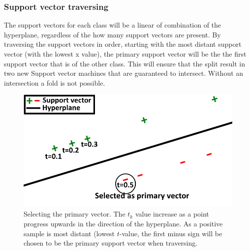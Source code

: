 \documentclass[a4paper,twoside]{bth}
\begin{document}
\subsubsection{Support vector traversing}
\par The support vectors for each class will be a linear of combination of the hyperplane, regardless of the how many support vectors are present. By traversing the support vectors in order, starting with the most distant support vector (with the lowest x value), the primary support vector will be the the first support vector that is of the other class. This will ensure that the split result in two new Support vector machines that are guaranteed to intersect. Without an intersection a fold is not possible. 
\begin{figure}
\centering
\includegraphics[scale=0.6]{images/intro-images/primaryvec2.png}
   \caption{Selecting the primary vector. The $t_k$ value increase as a point progress upwards in the direction of the hyperplane. As a positive sample is most distant (lowest $t$-value, the first minus sign will be chosen to be the primary support vector when traversing.}
   \label{fig:traverse}
\end{figure}
\end{document}
